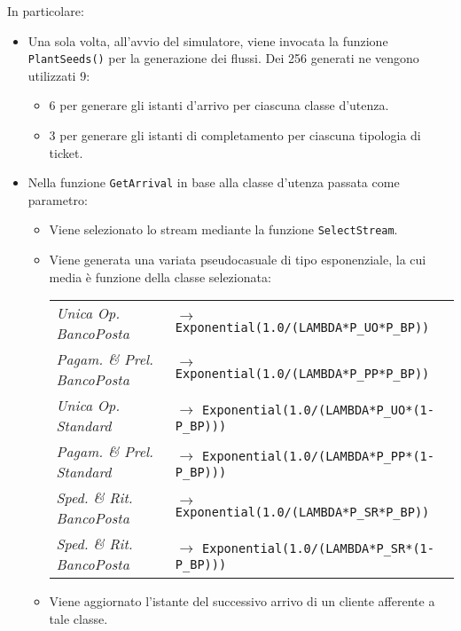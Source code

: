 In particolare:
\begin{itemize}
\item Una sola volta, all'avvio del simulatore, viene invocata la funzione \texttt{PlantSeeds()} per la generazione dei flussi. Dei 256 generati ne vengono utilizzati 9:
\begin{itemize}
\item 6 per generare gli istanti d'arrivo per ciascuna classe d'utenza.
\item 3 per generare gli istanti di completamento per ciascuna tipologia di ticket.
\end{itemize}

\item Nella funzione \texttt{GetArrival} in base alla classe d'utenza passata come parametro:
\begin{itemize}
\item Viene selezionato lo stream mediante la funzione \texttt{SelectStream}.
\item Viene generata una variata pseudocasuale di tipo esponenziale, la cui media è funzione della classe selezionata:
\begin{center}
\begin{tabular}{l l}
\textsl{Unica Op. BancoPosta} & $\to$ \texttt{Exponential(1.0/(LAMBDA*P\_UO*P\_BP))} \\
\textsl{Pagam. \& Prel. BancoPosta} & $\to$ \texttt{Exponential(1.0/(LAMBDA*P\_PP*P\_BP))} \\
\textsl{Unica Op. Standard} & $\to$ \texttt{Exponential(1.0/(LAMBDA*P\_UO*(1-P\_BP)))} \\
\textsl{Pagam. \& Prel. Standard} & $\to$ \texttt{Exponential(1.0/(LAMBDA*P\_PP*(1-P\_BP)))} \\
\textsl{Sped. \& Rit. BancoPosta} & $\to$ \texttt{Exponential(1.0/(LAMBDA*P\_SR*P\_BP))} \\
\textsl{Sped. \& Rit. BancoPosta} & $\to$ \texttt{Exponential(1.0/(LAMBDA*P\_SR*(1-P\_BP)))} \\
\end{tabular}
\end{center}
\item Viene aggiornato l'istante del successivo arrivo di un cliente afferente a tale classe.
\end{itemize}


\end{itemize}
